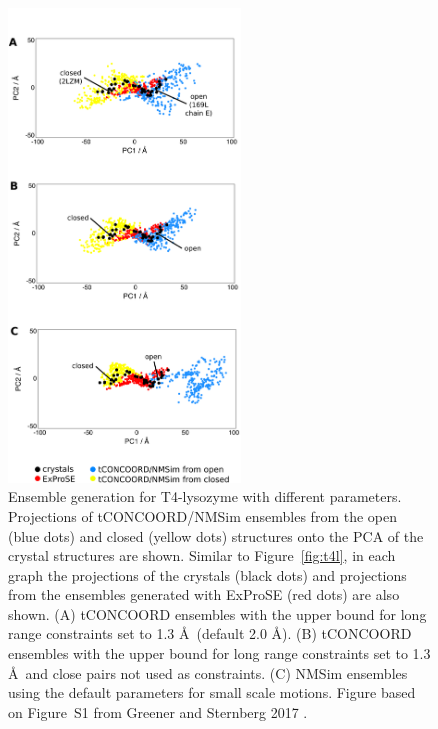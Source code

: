 \begin{figure}
\centering

\includegraphics[width=0.55\textwidth]{figures/method_params/method_params}

\caption{Ensemble generation for T4-lysozyme with different parameters.
Projections of tCONCOORD/NMSim ensembles from the open (blue dots) and closed (yellow dots) structures onto the PCA of the crystal structures are shown.
Similar to Figure~\ref{fig:t4l}, in each graph the projections of the crystals (black dots) and projections from the ensembles generated with ExProSE (red dots) are also shown.
(A) tCONCOORD ensembles with the upper bound for long range constraints set to 1.3 \AA\ (default 2.0 \AA ).
(B) tCONCOORD ensembles with the upper bound for long range constraints set to 1.3 \AA\ and close pairs not used as constraints.
(C) NMSim ensembles using the default parameters for small scale motions.
Figure based on Figure~S1 from Greener and Sternberg 2017 \cite{Greener2017}.}

\label{fig:method_params}
\end{figure}


